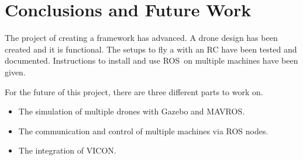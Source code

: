\chapter{Conclusions and Future Work}
The project of creating a framework has advanced.
A drone design has been created and it is functional.
The setups to fly a with an RC have been tested and documented.
Instructions to install and use ROS on multiple machines have been given.

For the future of this project, there are three different parts to work on.
\begin{itemize}
  \item The simulation of multiple drones with Gazebo and MAVROS.
  \item The communication and control of multiple machines via ROS nodes.
  \item The integration of VICON.
\end{itemize}
